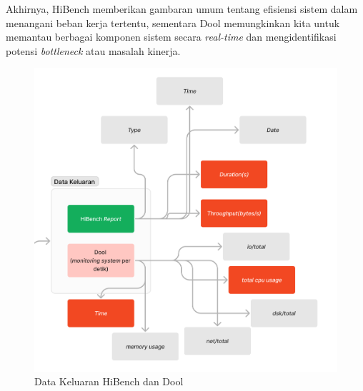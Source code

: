 Akhirnya, HiBench memberikan gambaran umum tentang efisiensi sistem dalam menangani beban kerja tertentu, sementara Dool memungkinkan kita untuk memantau berbagai komponen sistem secara\textit{ real-time} dan mengidentifikasi potensi \textit{bottleneck} atau masalah kinerja.

\begin{figure}[h]
    \centering
    \includegraphics[width=1\textwidth]{figures/ch02/output-hibench-dool.png}
    \caption{Data Keluaran HiBench dan Dool}
    \label{fig:output-hibench-dool}
\end{figure}
